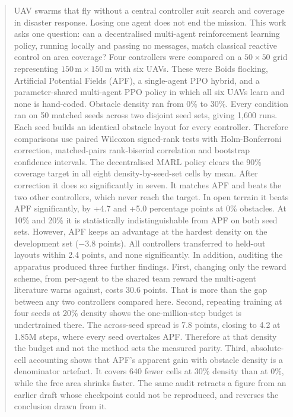 \documentclass[a4paper, 10pt, conference]{ieeeconf}
\begin{document}
\begin{abstract}
UAV swarms that fly without a central controller suit search and
coverage in disaster response. Losing one agent does not end the
mission. This work asks one question: can a decentralised multi-agent
reinforcement learning policy, running locally and passing no
messages, match classical reactive control on area coverage? Four
controllers were compared on a $50\times50$ grid representing
$150\,\text{m}\times150\,\text{m}$ with six UAVs. These were Boids
flocking, Artificial Potential Fields (APF), a single-agent PPO
hybrid, and a parameter-shared multi-agent PPO policy in which all six
UAVs learn and none is hand-coded. Obstacle density ran from 0\% to
30\%. Every condition ran on 50 matched seeds across two disjoint seed
sets, giving 1{,}600 runs. Each seed builds an identical obstacle
layout for every controller. Therefore comparisons use paired Wilcoxon
signed-rank tests with Holm-Bonferroni correction, matched-pairs
rank-biserial correlation and bootstrap confidence intervals. The
decentralised MARL policy clears the 90\% coverage target in all eight
density-by-seed-set cells by mean. After correction it does so
significantly in seven. It matches APF and beats the two other
controllers, which never reach the target. In open terrain it beats
APF significantly, by +4.7 and +5.0 percentage points at 0\%
obstacles. At 10\% and 20\% it is statistically indistinguishable from
APF on both seed sets. However, APF keeps an advantage at the hardest
density on the development set ($-3.8$ points). All controllers
transferred to held-out layouts within 2.4 points, and none
significantly. In addition, auditing the apparatus produced three
further findings. First, changing only the reward scheme, from
per-agent to the shared team reward the multi-agent literature warns
against, costs 30.6 points. That is more than the gap between any two
controllers compared here. Second, repeating training at four seeds at
20\% density shows the one-million-step budget is undertrained there.
The across-seed spread is 7.8 points, closing to 4.2 at 1.85M steps,
where every seed overtakes APF. Therefore at that density the budget
and not the method sets the measured parity. Third, absolute-cell
accounting shows that APF's apparent gain with obstacle density is a
denominator artefact. It covers 640 fewer cells at 30\% density than
at 0\%, while the free area shrinks faster. The same audit retracts a
figure from an earlier draft whose checkpoint could not be reproduced,
and reverses the conclusion drawn from it.
\end{abstract}
\end{document}
